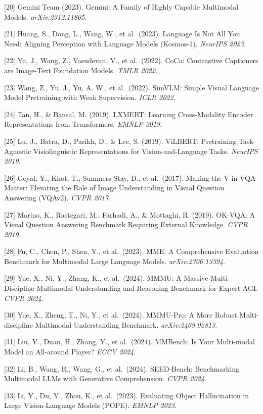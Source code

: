 {[}20{]} Gemini Team (2023). Gemini: A Family of Highly Capable Multimodal Models. \emph{arXiv:2312.11805}.

{[}21{]} Huang, S., Dong, L., Wang, W., et al.~(2023). Language Is Not All You Need: Aligning Perception with Language Models (Kosmos-1). \emph{NeurIPS 2023}.

{[}22{]} Yu, J., Wang, Z., Vasudevan, V., et al.~(2022). CoCa: Contrastive Captioners are Image-Text Foundation Models. \emph{TMLR 2022}.

{[}23{]} Wang, Z., Yu, J., Yu, A. W., et al.~(2022). SimVLM: Simple Visual Language Model Pretraining with Weak Supervision. \emph{ICLR 2022}.

{[}24{]} Tan, H., \& Bansal, M. (2019). LXMERT: Learning Cross-Modality Encoder Representations from Transformers. \emph{EMNLP 2019}.

{[}25{]} Lu, J., Batra, D., Parikh, D., \& Lee, S. (2019). ViLBERT: Pretraining Task-Agnostic Visiolinguistic Representations for Vision-and-Language Tasks. \emph{NeurIPS 2019}.

{[}26{]} Goyal, Y., Khot, T., Summers-Stay, D., et al.~(2017). Making the V in VQA Matter: Elevating the Role of Image Understanding in Visual Question Answering (VQAv2). \emph{CVPR 2017}.

{[}27{]} Marino, K., Rastegari, M., Farhadi, A., \& Mottaghi, R. (2019). OK-VQA: A Visual Question Answering Benchmark Requiring External Knowledge. \emph{CVPR 2019}.

{[}28{]} Fu, C., Chen, P., Shen, Y., et al.~(2023). MME: A Comprehensive Evaluation Benchmark for Multimodal Large Language Models. \emph{arXiv:2306.13394}.

{[}29{]} Yue, X., Ni, Y., Zhang, K., et al.~(2024). MMMU: A Massive Multi-Discipline Multimodal Understanding and Reasoning Benchmark for Expert AGI. \emph{CVPR 2024}.

{[}30{]} Yue, X., Zheng, T., Ni, Y., et al.~(2024). MMMU-Pro: A More Robust Multi-discipline Multimodal Understanding Benchmark. \emph{arXiv:2409.02813}.

{[}31{]} Liu, Y., Duan, H., Zhang, Y., et al.~(2024). MMBench: Is Your Multi-modal Model an All-around Player? \emph{ECCV 2024}.

{[}32{]} Li, B., Wang, R., Wang, G., et al.~(2024). SEED-Bench: Benchmarking Multimodal LLMs with Generative Comprehension. \emph{CVPR 2024}.

{[}33{]} Li, Y., Du, Y., Zhou, K., et al.~(2023). Evaluating Object Hallucination in Large Vision-Language Models (POPE). \emph{EMNLP 2023}.

